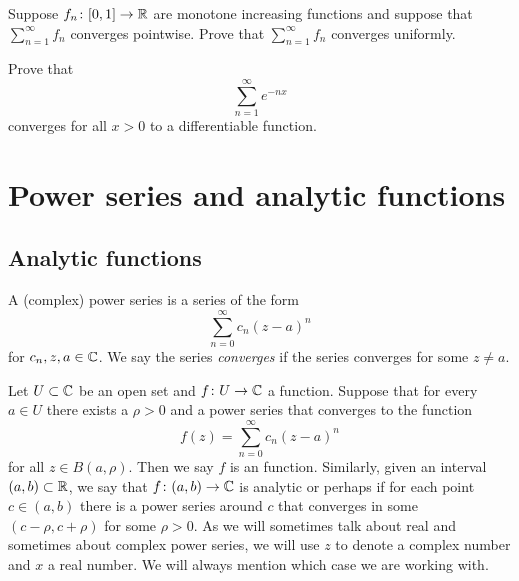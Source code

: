 \begin{exercise}
Suppose $f_n \colon [0,1] \to {\mathbb{R}}$ are monotone increasing functions and
suppose that $\sum_{n=1}^\infty f_n$ converges pointwise.  Prove that
$\sum_{n=1}^\infty f_n$
converges uniformly.
\end{exercise}

\begin{exercise}
Prove that
\begin{equation*}
\sum_{n=1}^\infty e^{-nx}
\end{equation*}
converges for all $x > 0$ to a differentiable function.
\end{exercise}


\sectionnewpage
\section{Power series and analytic functions}
\label{sec:analfuncs}



\subsection{Analytic functions}

A (complex) power series is a series of the form
\begin{equation*}
\sum_{n=0}^\infty c_n {(z-a)}^n
\end{equation*}
for $c_n, z, a \in {\mathbb{C}}$.  We say the series
\emph{converges} if the series converges for
some $z \neq a$.

Let $U \subset {\mathbb{C}}$ be an open set and
$f \colon U \to {\mathbb{C}}$ a function.
Suppose that for every $a \in U$ there exists a $\rho > 0$ and a power
series that converges to the function
\begin{equation*}
f(z) = \sum_{n=0}^\infty c_n {(z-a)}^n
\end{equation*}
for all $z \in B(a,\rho)$.
Then we say $f$ is an \emph{} function.
Similarly, given an interval $(a,b) \subset {\mathbb{R}}$, we say that $f \colon (a,b) \to {\mathbb{C}}$
is analytic or perhaps \emph{}
if for each point $c \in
(a,b)$ there is a power series around $c$ that converges in some
$(c-\rho,c+\rho)$
for some $\rho > 0$.
As we will sometimes talk about real and sometimes about complex power
series, we will use $z$ to denote a complex number and $x$ a real number.
We will always mention which case we are working with.


